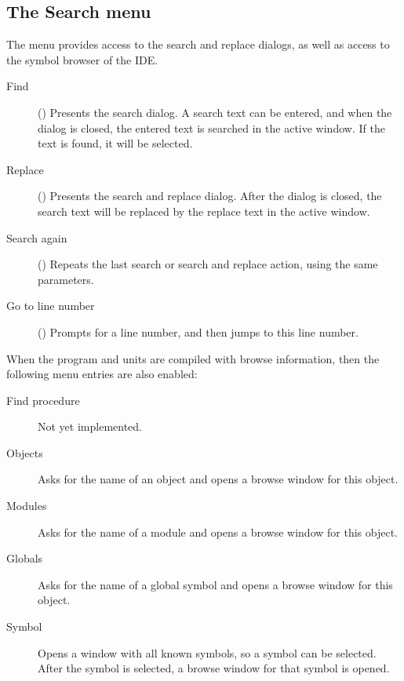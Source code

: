 %
%
\subsection{The Search menu}
\label{se:menusearch}
The  menu provides access to the search and replace dialogs, as well as
access to the symbol browser of the IDE. 
\begin{description}
\item[Find] () Presents the search dialog. A search text 
can be entered, and when the dialog is closed, the entered text is searched
in the active window. If the text is found, it will be selected. 
\item[Replace] () Presents the search and replace dialog.
After the dialog is closed, the search text will be replaced by the replace
text in the active window.
\item[Search again] () Repeats the last search or search and replace action,
 using  the same parameters.
\item[Go to line number] () Prompts for a line number, and
then jumps to this line number.
\end{description}
When the program and units are compiled with browse information, then
the following menu entries are also enabled:
\begin{description}
\item[Find procedure]
Not yet implemented.
\item[Objects]
Asks for the name of an object and opens a browse window for this object.
\item[Modules]
Asks for the name of a module and opens a browse window for this object.
\item[Globals]
Asks for the name of a global symbol and opens a browse window for this object.
\item[Symbol]
Opens a window with all known symbols, so a symbol can be selected. After
the symbol is selected, a browse window for that symbol is opened.
\end{description}
%
%
